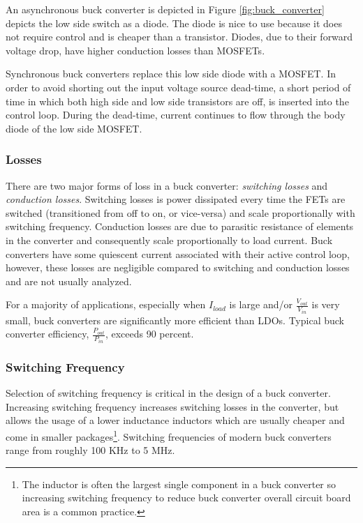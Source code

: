 \documentclass[main.tex]{subfiles}
\begin{document}
\newnoindentpara An asynchronous buck converter is depicted in Figure \ref{fig:buck_converter} depicts the low side switch as a diode. The diode is nice to use because it does not require control and is cheaper than a transistor. Diodes, due to their forward voltage drop, have higher conduction losses than MOSFETs. \newline

\newnoindentpara Synchronous buck converters replace this low side diode with a MOSFET. In order to avoid shorting out the input voltage source dead-time, a short period of time in which both high side and low side transistors are off, is inserted into the control loop. During the dead-time, current continues to flow through the body diode of the low side MOSFET. 

\subsubsection{Losses}
There are two major forms of loss in a buck converter: \textit{switching losses} and \textit{conduction losses}. Switching losses is power dissipated every time the FETs are switched (transitioned from off to on, or vice-versa) and scale proportionally with switching frequency. Conduction losses are due to parasitic resistance of elements in the converter and consequently scale proportionally to load current. Buck converters have some quiescent current associated with their active control loop, however, these losses are negligible compared to switching and conduction losses and are not usually analyzed. \newline

\newnoindentpara For a majority of applications, especially when $I_{load}$ is large and/or $\frac{V_{out}}{V_{in}}$ is very small, buck converters are significantly more efficient than LDOs. Typical buck converter efficiency, $\frac{P_{out}}{P_{in}}$, exceeds 90 percent.  

\subsubsection{Switching Frequency}
Selection of switching frequency is critical in the design of a buck converter. Increasing switching frequency increases switching losses in the converter, but allows the usage of a lower inductance inductors which are usually cheaper and come in smaller packages\footnote{The inductor is often the largest single component in a buck converter so increasing switching frequency to reduce buck converter overall circuit board area is a common practice.}. Switching frequencies of modern buck converters range from roughly 100 KHz to 5 MHz. 
\end{document}
